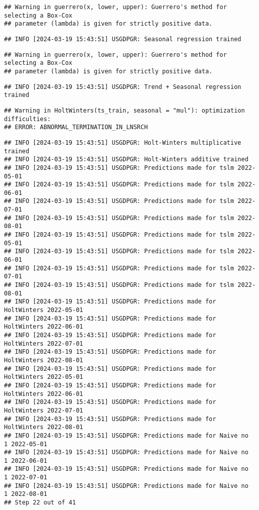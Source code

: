 \documentclass[
]{article}
\begin{document}
\begin{verbatim}
## Warning in guerrero(x, lower, upper): Guerrero's method for selecting a Box-Cox
## parameter (lambda) is given for strictly positive data.
\end{verbatim}

\begin{verbatim}
## INFO [2024-03-19 15:43:51] USGDPGR: Seasonal regression trained
\end{verbatim}

\begin{verbatim}
## Warning in guerrero(x, lower, upper): Guerrero's method for selecting a Box-Cox
## parameter (lambda) is given for strictly positive data.
\end{verbatim}

\begin{verbatim}
## INFO [2024-03-19 15:43:51] USGDPGR: Trend + Seasonal regression trained
\end{verbatim}

\begin{verbatim}
## Warning in HoltWinters(ts_train, seasonal = "mul"): optimization difficulties:
## ERROR: ABNORMAL_TERMINATION_IN_LNSRCH
\end{verbatim}

\begin{verbatim}
## INFO [2024-03-19 15:43:51] USGDPGR: Holt-Winters multiplicative trained
## INFO [2024-03-19 15:43:51] USGDPGR: Holt-Winters additive trained
## INFO [2024-03-19 15:43:51] USGDPGR: Predictions made for tslm 2022-05-01
## INFO [2024-03-19 15:43:51] USGDPGR: Predictions made for tslm 2022-06-01
## INFO [2024-03-19 15:43:51] USGDPGR: Predictions made for tslm 2022-07-01
## INFO [2024-03-19 15:43:51] USGDPGR: Predictions made for tslm 2022-08-01
## INFO [2024-03-19 15:43:51] USGDPGR: Predictions made for tslm 2022-05-01
## INFO [2024-03-19 15:43:51] USGDPGR: Predictions made for tslm 2022-06-01
## INFO [2024-03-19 15:43:51] USGDPGR: Predictions made for tslm 2022-07-01
## INFO [2024-03-19 15:43:51] USGDPGR: Predictions made for tslm 2022-08-01
## INFO [2024-03-19 15:43:51] USGDPGR: Predictions made for HoltWinters 2022-05-01
## INFO [2024-03-19 15:43:51] USGDPGR: Predictions made for HoltWinters 2022-06-01
## INFO [2024-03-19 15:43:51] USGDPGR: Predictions made for HoltWinters 2022-07-01
## INFO [2024-03-19 15:43:51] USGDPGR: Predictions made for HoltWinters 2022-08-01
## INFO [2024-03-19 15:43:51] USGDPGR: Predictions made for HoltWinters 2022-05-01
## INFO [2024-03-19 15:43:51] USGDPGR: Predictions made for HoltWinters 2022-06-01
## INFO [2024-03-19 15:43:51] USGDPGR: Predictions made for HoltWinters 2022-07-01
## INFO [2024-03-19 15:43:51] USGDPGR: Predictions made for HoltWinters 2022-08-01
## INFO [2024-03-19 15:43:51] USGDPGR: Predictions made for Naive no  1 2022-05-01
## INFO [2024-03-19 15:43:51] USGDPGR: Predictions made for Naive no  1 2022-06-01
## INFO [2024-03-19 15:43:51] USGDPGR: Predictions made for Naive no  1 2022-07-01
## INFO [2024-03-19 15:43:51] USGDPGR: Predictions made for Naive no  1 2022-08-01
## Step 22 out of 41
\end{verbatim}
\end{document}
